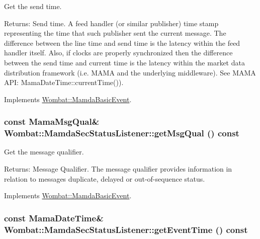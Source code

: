 Get the send time. 

\begin{Desc}
\item[Returns:]Send time. A feed handler (or similar publisher) time stamp representing the time that such publisher sent the current message. The difference between the line time and send time is the latency within the feed handler itself. Also, if clocks are properly synchronized then the difference between the send time and current time is the latency within the market data distribution framework (i.e. MAMA and the underlying middleware). See MAMA API: Mama\-Date\-Time::current\-Time()). \end{Desc}


Implements \hyperlink{classWombat_1_1MamdaBasicEvent_b0602a83bec20cd8b341ec866ff3bffa}{Wombat::Mamda\-Basic\-Event}.\hypertarget{classWombat_1_1MamdaSecStatusListener_a3f070a7969f59ad8110f20d7743ed16}{
\subsubsection[getMsgQual]{\setlength{\rightskip}{0pt plus 5cm}const Mama\-Msg\-Qual\& Wombat::Mamda\-Sec\-Status\-Listener::get\-Msg\-Qual () const}}
\label{classWombat_1_1MamdaSecStatusListener_a3f070a7969f59ad8110f20d7743ed16}


Get the message qualifier. 

\begin{Desc}
\item[Returns:]Message Qualifier. The message qualifier provides information in relation to messages duplicate, delayed or out-of-sequence status. \end{Desc}


Implements \hyperlink{classWombat_1_1MamdaBasicEvent_675ce8f1de581548426335423d6b3864}{Wombat::Mamda\-Basic\-Event}.\hypertarget{classWombat_1_1MamdaSecStatusListener_0e27b7c2e100fbc7247c898c56536d1c}{
\subsubsection[getEventTime]{\setlength{\rightskip}{0pt plus 5cm}const Mama\-Date\-Time\& Wombat::Mamda\-Sec\-Status\-Listener::get\-Event\-Time () const}}
\label{classWombat_1_1MamdaSecStatusListener_0e27b7c2e100fbc7247c898c56536d1c}


